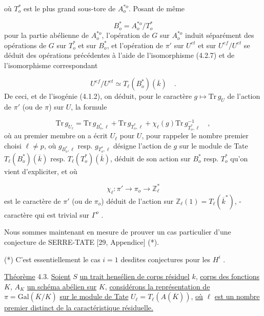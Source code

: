 
où $T^{*}_{o}$ est le plus grand sous-tore de $A^{*o}_{o}$. Posant de même

\begin{equation}\tag{4.2.8}
B^{*}_{o} = A^{*o}_{o}/T^{*}_{o}
\end{equation}
pour la partie abélienne de $A^{*o}_{o}$, l'opération de $G$ sur $A^{*o}_{o}$ induit séparément des opérations de $G$ sur $T^{*}_{o}$ et sur $B^{*}_{o}$, et l'opération de $\pi'$ sur $U^{et}$ et sur $U^{ef}/U^{et}$ se déduit des opérations précédentes à l'aide de l'isomorphisme (4.2.7) et de l'isomorphisme correspondant

\begin{equation}\tag{4.2.9}
U^{ef}/U^{et} \simeq T_{\ell}(B^{*}_{o})(\overline{k}) \quad .
\end{equation}
De ceci, et de l'isogénie (4.1.2), on déduit, pour le caractère $g \longmapsto \mathrm{Tr}\, g_{U}$ de l'action de $\pi'$ (ou de $\pi$) sur $U$, la formule

\begin{equation}\tag{4.2.10}
\mathrm{Tr}\, g_{U_{\ell}} = \mathrm{Tr}\, g_{B^{*}_{o},\ell} + \mathrm{Tr}\, g_{T^{*}_{o},\ell} + \chi_{\ell}(g)\mathrm{Tr}\, g^{-1}_{T^{*}_{o},\ell} \quad ,
\end{equation}
où au premier membre on a écrit $U_{\ell}$ pour $U$, pour rappeler le nombre premier choisi $\ell \neq p$, où $g_{B^{*}_{o},\ell}$ resp. $g_{T^{*}_{o},\ell}$ désigne l'action de $g$ sur le module de Tate $T_{\ell}(B^{*}_{o})(\overline{k})$ resp. $T_{\ell}(T^{*}_{o})(\overline{k})$, déduit de son action sur $B^{*}_{o}$ resp. $T^{*}_{o}$ qu'on vient d'expliciter, et où

\begin{equation}\tag{4.2.11}
\chi_{\ell} : \pi' \longrightarrow \pi_{o} \longrightarrow \mathbb{Z}^{*}_{\ell}
\end{equation}
est le caractère de $\pi'$ (ou de $\pi_{o}$) déduit de l'action sur $\mathbb{Z}_{\ell}(1) = T_{\ell}(\overline{k}^{*})$, - caractère qui est trivial sur $\Gamma^{o}$ .

Nous sommes maintenant en mesure de prouver un cas particulier d'une conjecture de SERRE-TATE [29, Appendice] (*).

(*) C'est essentiellement le cas $i=1$ desdites conjectures pour les $H^{i}$ .



\underline{Théorème} 4.3. \underline{Soient} $S$ \underline{un trait hensélien de corps résiduel} $k$, \underline{corps des fonctions} $K$, $A_K$ \underline{un schéma abélien sur} $K$, \underline{considérons la représentation de} $\pi = \mathrm{Gal}(\overline{K}/K)$ \underline{sur le module de Tate} $U_\ell = T_\ell(A(\overline{K}))$, \underline{où} $\ell$ \underline{est un nombre premier distinct de la caractéristique résiduelle.}


